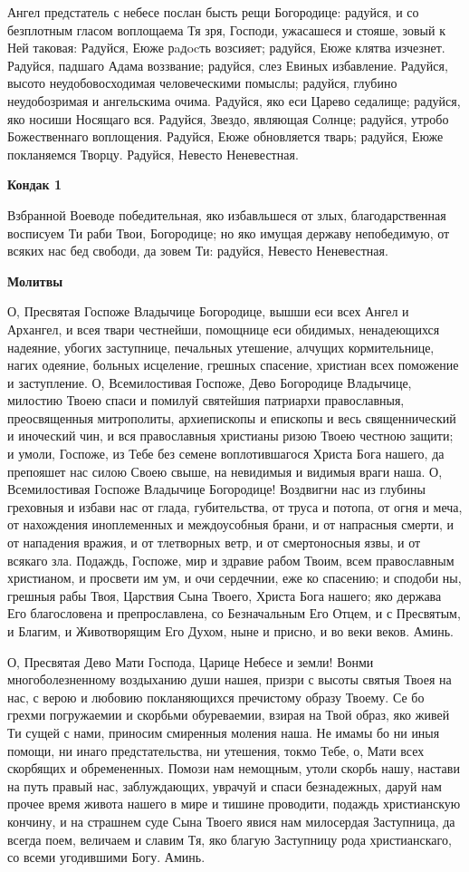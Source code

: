 Ангел предстатель с небесе послан бысть рещи Богородице: радуйся, и со безплотным гласом воплощаема Тя зря, Господи, ужасашеся и стояше, зовый к Ней таковая: Радуйся, Еюже рaдocть возсияет; радуйся, Еюже клятва изчезнет. Радуйся, падшаго Адама воззвание; радуйся, слез Евиных избавление. Радуйся, высото неудобовосходимая человеческими помыслы; радуйся, глубино неудобозримая и ангельскима очима. Радуйся, яко еси Царево седалище; радуйся, яко носиши Носящаго вся. Радуйся, Звездо, являющая Солнце; радуйся, утробо Божественнаго воплощения. Радуйся, Еюже обновляется тварь; радуйся, Еюже покланяемся Творцу. Радуйся, Невесто Неневестная.


\bfseries Кондак 1\normalfont{}


Взбранной Воеводе победительная, яко избавльшеся от злых, благодарственная восписуем Ти раби Твои, Богородице; но яко имущая державу непобедимую, от всяких нас бед свободи, да зовем Ти: радуйся, Невесто Неневестная.


\bfseries Молитвы\normalfont{}


О, Пресвятая Госпоже Владычице Богородице, вышши еси всех Ангел и Архангел, и всея твари честнейши, помощнице еси обидимых, ненадеющихся надеяние, убогих заступнице, печальных утешение, алчущих кормительнице, нагих одеяние, больных исцеление, грешных спасение, христиан всех поможение и заступление. О, Всемилостивая Госпоже, Дево Богородице Владычице, милостию Твоею спаси и помилуй святейшия патриархи православныя, преосвященныя митрополиты, архиепископы и епископы и весь священнический и иноческий чин, и вся православныя христианы ризою Твоею честною защити; и умоли, Госпоже, из Тебе без семене воплотившагося Христа Бога нашего, да препояшет нас силою Своею свыше, на невидимыя и видимыя враги наша. О, Всемилостивая Госпоже Владычице Богородице! Воздвигни нас из глубины греховныя и избави нас от глада, губительства, от труса и потопа, от огня и меча, от нахождения иноплеменных и междоусобныя брани, и от напрасныя смерти, и от нападения вражия, и от тлетворных ветр, и от смертоносныя язвы, и от всякаго зла. Подаждь, Госпоже, мир и здравие рабом Твоим, всем православным христианом, и просвети им ум, и очи сердечнии, еже ко спасению; и сподоби ны, грешныя рабы Твоя, Царствия Сына Твоего, Христа Бога нашего; яко держава Его благословена и препрославлена, со Безначальным Его Отцем, и с Пресвятым, и Благим, и Животворящим Его Духом, ныне и присно, и во веки веков. Аминь.


О, Пресвятая Дево Мати Господа, Царице Небесе и земли! Вонми многоболезненному воздыханию души нашея, призри с высоты святыя Твоея на нас, с верою и любовию покланяющихся пречистому образу Твоему. Се бо грехми погружаемии и скорбьми обуреваемии, взирая на Твой образ, яко живей Ти сущей с нами, приносим смиренныя моления наша. Не имамы бо ни иныя помощи, ни инаго предстательства, ни утешения, токмо Тебе, о, Мати всех скорбящих и обремененных. Помози нам немощным, утоли скорбь нашу, настави на путь правый нас, заблуждающих, уврачуй и спаси безнадежных, даруй нам прочее время живота нашего в мире и тишине проводити, подаждь христианскую кончину, и на страшнем суде Сына Твоего явися нам милосердая Заступница, да всегда поем, величаем и славим Тя, яко благую Заступницу рода христианскаго, со всеми угодившими Богу. Аминь.

